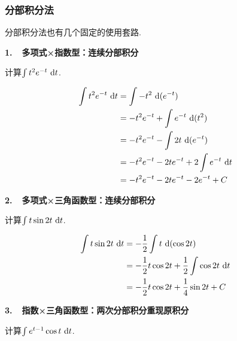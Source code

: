 \subsubsection{分部积分法}\par
分部积分法也有几个固定的使用套路. \vspace{1em}

\textbf{1.~~多项式×指数型：连续分部积分}

\begin{example}
\label{ex:ch03-20}
计算$\int t^2 e^{-t}~\mathrm{d} t$.
\end{example}

\begin{solution}
\begin{equation}
    \begin{aligned}
        \int t^2 e^{-t}~\mathrm{d} t
        &= \int -t^2~\mathrm{d}(e^{-t}) \\
        &= -t^2e^{-t} + \int  e^{-t}~\mathrm{d}(t^2) \\
        &= -t^2e^{-t} - \int 2t~\mathrm{d}(e^{-t}) \\
        &= -t^2e^{-t} -2te^{-t} +2 \int e^{-t} ~\mathrm{d} t \\
        &= -t^2e^{-t} -2te^{-t} -2e^{-t} +C
        \nonumber
    \end{aligned}
\end{equation}
\end{solution}

\textbf{2.~~多项式×三角函数型：连续分部积分}

\begin{example}
\label{ex:ch03-21}
计算$\int t\sin 2t ~\mathrm{d} t$.
\end{example}

\begin{solution}
\begin{equation}
    \begin{aligned}
        \int t\sin 2t ~\mathrm{d} t
        &= -\frac{1}{2} \int t ~\mathrm{d}(\cos 2t) \\
        &= -\frac{1}{2}t\cos 2t + \frac{1}{2} \int \cos 2t ~\mathrm{d} t \\
        &= -\frac{1}{2}t\cos 2t + \frac{1}{4}\sin 2t +C
        \nonumber
    \end{aligned}
\end{equation}
\end{solution}

\textbf{3.~~指数×三角函数型：两次分部积分重现原积分}

\begin{example}
\label{ex:ch03-22}
计算$\int e^{t-1} \cos t ~\mathrm{d} t$.
\end{example}

